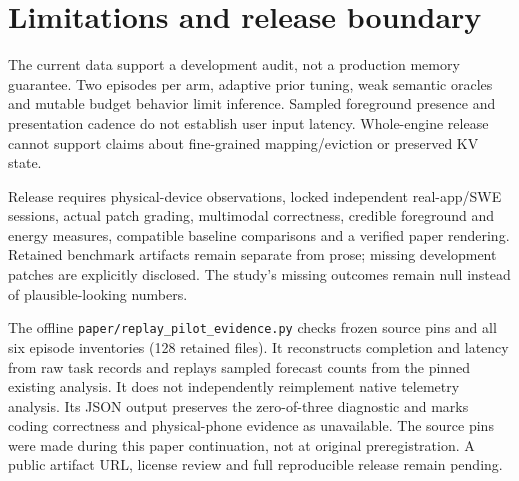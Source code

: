 \documentclass[10pt,twocolumn]{article}
\begin{document}
\section{Limitations and release boundary}
The current data support a development audit, not a production memory guarantee.
Two episodes per arm, adaptive prior tuning, weak semantic oracles and mutable
budget behavior limit inference. Sampled foreground presence and presentation
cadence do not establish user input latency. Whole-engine release cannot support
claims about fine-grained mapping/eviction or preserved KV state.

Release requires physical-device observations, locked independent real-app/SWE
sessions, actual patch grading, multimodal correctness, credible foreground and
energy measures, compatible baseline comparisons and a verified paper rendering.
Retained benchmark artifacts remain separate from prose; missing development
patches are explicitly disclosed. The study's
missing outcomes remain null instead of plausible-looking numbers.

The offline \texttt{paper/replay\_pilot\_evidence.py} checks frozen source pins
and all six episode inventories (128 retained files). It reconstructs completion
and latency from raw task records and replays sampled forecast counts from the
pinned existing analysis. It does not independently reimplement native telemetry
analysis. Its JSON output preserves the zero-of-three diagnostic and marks coding
correctness and physical-phone evidence as unavailable. The source pins were
made during this paper continuation, not at original preregistration. A public
artifact URL, license review and full reproducible release remain pending.
\end{document}
